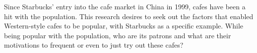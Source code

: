 Since Starbucks' entry into the cafe market in China in 1999, cafes have been a
hit with the population. This research desires to seek out the factors that
enabled Western-style cafes to be popular, with Starbucks as a specific example.
While being popular with the population, who are its patrons and what are their
motivations to frequent or even to just try out these cafes?







\begin{comment}
\begin{itemize}
	\item Habitus as a framework
	\item Drinker demographics
	\item How did international franchises adapt
	\item How did the coffee culture start
\end{itemize}
\end{comment}


